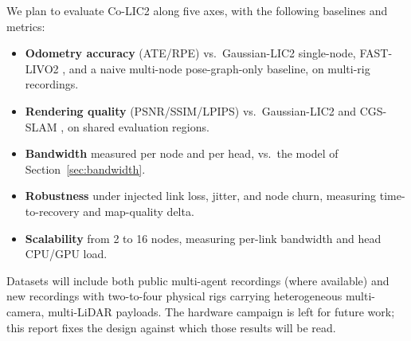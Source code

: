 We plan to evaluate Co-LIC2 along five axes, with the following baselines and
metrics:

\begin{itemize}
  \item \textbf{Odometry accuracy} (ATE/RPE) vs.\ Gaussian-LIC2 single-node,
    FAST-LIVO2 \cite{zheng2024fastlivo2}, and a naive multi-node
    pose-graph-only baseline, on multi-rig recordings.
  \item \textbf{Rendering quality} (PSNR/SSIM/LPIPS) vs.\ Gaussian-LIC2 and
    CGS-SLAM \cite{deambrogi2026cgsslam}, on shared evaluation regions.
  \item \textbf{Bandwidth} measured per node and per head, vs.\ the model of
    Section~\ref{sec:bandwidth}.
  \item \textbf{Robustness} under injected link loss, jitter, and node
    churn, measuring time-to-recovery and map-quality delta.
  \item \textbf{Scalability} from 2 to 16 nodes, measuring per-link bandwidth
    and head CPU/GPU load.
\end{itemize}

Datasets will include both public multi-agent recordings (where available) and
new recordings with two-to-four physical rigs carrying heterogeneous
multi-camera, multi-LiDAR payloads. The hardware campaign is left for future
work; this report fixes the design against which those results will be read.
